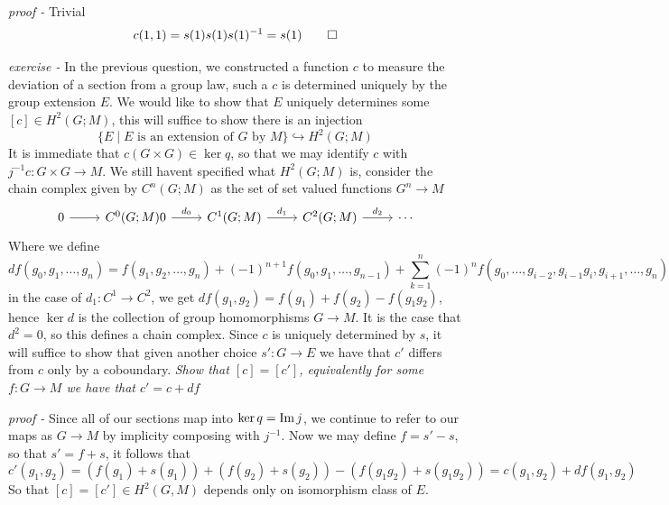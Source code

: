 \documentclass[11pt]{article}
\theoremstyle{definition}
\newcommand{\set}[1]{\{#1\}}
\newcommand{\im}{\text{Im\,}}
\begin{document}
    \emph{proof - } Trivial
    \begin{align*}
        c(1,1) = s(1)s(1)s(1)^{-1} = s(1) \qed
    \end{align*}


    \emph{exercise - }\label{CEx12} In the previous question, we constructed a function \(c\) to measure the deviation of a section from a group law, such a \(c\) is determined uniquely by the group extension \(E\). We would like to show that \(E\) uniquely determines some \([c] \in H^2(G;M)\), this will suffice to show there is an injection \[\set{E \mid E \text{ is an extension of }G \text{ by }M} \hookrightarrow H^2(G;M)\]
    It is immediate that \(c(G \times G) \in \ker q\), so that we may identify \(c\) with \(j^{-1}c : G \times G \to M\). We still havent specified what \(H^2(G;M)\) is, consider the chain complex given by \(C^n(G;M)\) as the set of set valued functions \(G^n \to M\)
    \begin{equation*}
        \begin{tikzcd}
            0 \arrow[r,"{}"] & C^0(G;M) 0 \arrow[r,"{d_0}"] & C^1(G;M) \arrow[r,"{d_1}"] & C^2(G;M) \arrow[r,"{d_2}"] & \cdots
        \end{tikzcd}
    \end{equation*}
    Where we define \[df(g_0,g_1,\hdots,g_n) = f(g_1,g_2,\hdots,g_n) + (-1)^{n+1}f(g_0,g_1,\hdots,g_{n-1}) + \sum_{k=1}^n (-1)^nf(g_0,\hdots,g_{i-2},g_{i-1}g_i,g_{i+1},\hdots,g_n)\]
    in the case of \(d_1: C^1 \to C^2\), we get \(df(g_1,g_2) = f(g_1) + f(g_2) - f(g_1g_2)\), hence \(\ker d\) is the collection of group homomorphisms \(G \to M\). It is the case that \(d^2 = 0\), so this defines a chain complex. Since \(c\) is uniquely determined by \(s\), it will suffice to show that given another choice \(s': G \to E\) we have that \(c'\) differs from \(c\) only by a coboundary. \emph{Show that \([c] = [c']\), equivalently for some \(f: G \to M\) we have that \(c' = c + df\)}

    \emph{proof - } Since all of our sections map into \(\ker q = \im j\), we continue to refer to our maps as \(G \to M\) by implicity composing with \(j^{-1}\). Now we may define \(f = s' - s\), so that \(s' = f + s\), it follows that \[c'(g_1,g_2) = (f(g_1) + s(g_1)) + (f(g_2) + s(g_2)) - (f(g_1g_2) + s(g_1g_2)) = c(g_1,g_2) + df(g_1,g_2)\]
    So that \([c] = [c'] \in H^2(G,M)\) depends only on isomorphism class of \(E\).
\end{document}

